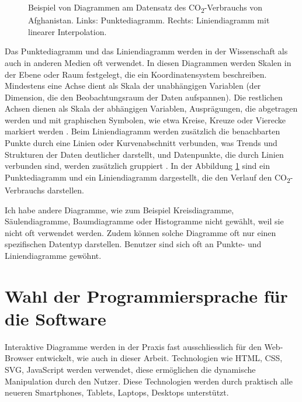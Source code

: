 \begin{figure}[!htbp]
\begin{minipage}{0.45\textwidth}
	\end{minipage}
	\caption[Vergleich zwischen Punktediagramm und Liniendiagramm]{Beispiel von Diagrammen am Datensatz des CO\textsubscript{2}-Verbrauchs von Afghanistan. Links: Punktediagramm. Rechts: Liniendiagramm mit linearer Interpolation.}
	\label{fig:scatterplot}
\end{figure}

Das Punktediagramm und das Liniendiagramm werden in der Wissenschaft als auch in anderen Medien oft verwendet. In diesen Diagrammen werden Skalen in der Ebene oder Raum festgelegt, die ein Koordinatensystem beschreiben. Mindestens eine Achse dient als Skala der unabhängigen Variablen (der Dimension, die den Beobachtungsraum der Daten aufspannen). Die restlichen Achsen dienen als Skala der abhängigen Variablen, Ausprägungen, die abgetragen werden und mit graphischen Symbolen, wie etwa Kreise, Kreuze oder Vierecke markiert werden \cite{viz}. Beim Liniendiagramm werden zusätzlich die benachbarten Punkte durch eine Linien oder Kurvenabschnitt verbunden, was Trends und Strukturen der Daten deutlicher darstellt, und Datenpunkte, die durch Linien verbunden sind, werden zusätzlich gruppiert \cite{viz}. In der Abbildung \ref{fig:scatterplot} sind ein Punktediagramm und ein Liniendiagramm dargestellt, die den Verlauf den CO\textsubscript{2}-Verbrauchs darstellen.

Ich habe andere Diagramme, wie zum Beispiel Kreisdiagramme, Säulendiagramme, Baumdiagramme oder Histogramme nicht gewählt, weil sie nicht oft verwendet werden. Zudem können solche Diagramme oft nur einen spezifischen Datentyp darstellen. Benutzer sind sich oft an Punkte- und Liniendiagramme gewöhnt.

\section{Wahl der Programmiersprache für die Software}

Interaktive Diagramme werden in der Praxis fast ausschliesslich für den Web-Browser entwickelt, wie auch in dieser Arbeit. Technologien wie HTML, CSS, SVG, JavaScript werden verwendet, diese ermöglichen die dynamische Manipulation durch den Nutzer. Diese Technologien werden durch praktisch alle neueren Smartphones, Tablets, Laptops, Desktops unterstützt.

